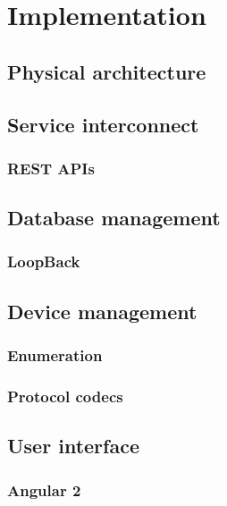 \documentclass[../thesis]{subfiles}
\begin{document}
\chapter{Implementation}



\section{Physical architecture}



\section{Service interconnect}

\subsection{REST APIs}



\section{Database management}

\subsection{LoopBack}


\section{Device management}

\subsection{Enumeration}
\subsection{Protocol codecs}



\section{User interface}

\subsection{Angular 2}
\end{document}
